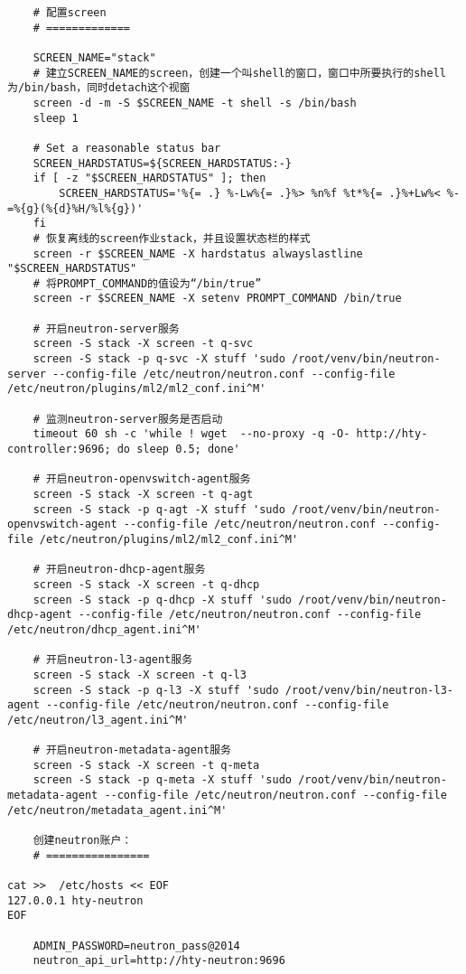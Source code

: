 \documentclass[a4paper,left=1.5cm,right=1.5cm,11pt]{article}
\begin{document}
	\begin{lstlisting}
	# 配置screen
	# =============
	
	SCREEN_NAME="stack"
	# 建立SCREEN_NAME的screen，创建一个叫shell的窗口，窗口中所要执行的shell为/bin/bash，同时detach这个视窗
	screen -d -m -S $SCREEN_NAME -t shell -s /bin/bash
    sleep 1

    # Set a reasonable status bar
    SCREEN_HARDSTATUS=${SCREEN_HARDSTATUS:-}
    if [ -z "$SCREEN_HARDSTATUS" ]; then
        SCREEN_HARDSTATUS='%{= .} %-Lw%{= .}%> %n%f %t*%{= .}%+Lw%< %-=%{g}(%{d}%H/%l%{g})'
    fi
	# 恢复离线的screen作业stack，并且设置状态栏的样式
    screen -r $SCREEN_NAME -X hardstatus alwayslastline "$SCREEN_HARDSTATUS"
	# 将PROMPT_COMMAND的值设为“/bin/true”
    screen -r $SCREEN_NAME -X setenv PROMPT_COMMAND /bin/true

	# 开启neutron-server服务
	screen -S stack -X screen -t q-svc
	screen -S stack -p q-svc -X stuff 'sudo /root/venv/bin/neutron-server --config-file /etc/neutron/neutron.conf --config-file /etc/neutron/plugins/ml2/ml2_conf.ini^M'

	# 监测neutron-server服务是否启动
	timeout 60 sh -c 'while ! wget  --no-proxy -q -O- http://hty-controller:9696; do sleep 0.5; done'

	# 开启neutron-openvswitch-agent服务
	screen -S stack -X screen -t q-agt
	screen -S stack -p q-agt -X stuff 'sudo /root/venv/bin/neutron-openvswitch-agent --config-file /etc/neutron/neutron.conf --config-file /etc/neutron/plugins/ml2/ml2_conf.ini^M'

	# 开启neutron-dhcp-agent服务
	screen -S stack -X screen -t q-dhcp
	screen -S stack -p q-dhcp -X stuff 'sudo /root/venv/bin/neutron-dhcp-agent --config-file /etc/neutron/neutron.conf --config-file /etc/neutron/dhcp_agent.ini^M'

	# 开启neutron-l3-agent服务
	screen -S stack -X screen -t q-l3
	screen -S stack -p q-l3 -X stuff 'sudo /root/venv/bin/neutron-l3-agent --config-file /etc/neutron/neutron.conf --config-file /etc/neutron/l3_agent.ini^M'

	# 开启neutron-metadata-agent服务
	screen -S stack -X screen -t q-meta
	screen -S stack -p q-meta -X stuff 'sudo /root/venv/bin/neutron-metadata-agent --config-file /etc/neutron/neutron.conf --config-file /etc/neutron/metadata_agent.ini^M'

	创建neutron账户：
	# ================

cat >>  /etc/hosts << EOF
127.0.0.1 hty-neutron
EOF

	ADMIN_PASSWORD=neutron_pass@2014
	neutron_api_url=http://hty-neutron:9696


\end{lstlisting}
\end{document}
